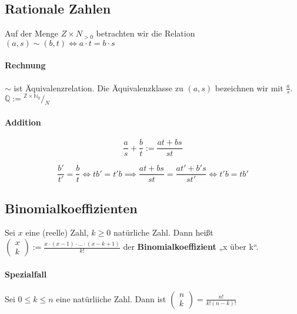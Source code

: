 \documentclass[14pt,a4paper]{article}
\newcommand*\rfrac[2]{{}^{#1}\!/_{#2}}
\begin{document}
		\subsection{Rationale Zahlen}
			Auf der Menge $ Z \times N_{>0} $ betrachten wir die Relation $(a,s) \sim (b,t) \Leftrightarrow a \cdot t = b \cdot s $
			\paragraph{Rechnung} $\sim$ ist Äquivalenzrelation.
			Die Äquivalenzklasse zu $(a,s)$ bezeichnen wir mit $\frac{a}{s}$. \\
			$ \mathbb{Q} := \rfrac{\mathbb{Z} \times \mathbb{N}_0}{N}$
			\paragraph{Addition}
				$$ \frac{a}{s} + \frac{b}{t} := \frac{at + bs}{st} $$

				$$ \frac{b'}{t'} = \frac{b}{t} \Leftrightarrow t b' = t' b \implies \frac{at + bs}{st} = \frac{at' + b's}{s t'} \Leftrightarrow t'b = t b' $$

		\subsection{Binomialkoeffizienten}
			Sei $x$ eine (reelle) Zahl, $ k \geq 0 $ natürliche Zahl.
			Dann heißt $ \left(\!\begin{array}{c} x \\ k \end{array}\!\right) := \frac{x \cdot (x-1) \cdot \dots \cdot (x - k + 1)}{k!} $ der \textbf{Binomialkoeffizient} „x über k“.
			\paragraph{Spezialfall}
				Sei $ 0 \leq k \leq n $ eine natürliiche Zahl. Dann ist $ \left(\!\begin{array}{c} n \\ k \end{array}\!\right) = \frac{n!}{k!(n-k)!} $
\end{document}
